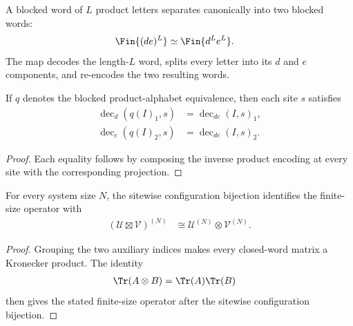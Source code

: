 \begin{definition}
    \label{def:mpu_tensor_product_block_equiv}
    \leanok
    A blocked word of $L$ product letters separates canonically into two
    blocked words:
    \begin{align}
        \Fin{(de)^L} & \simeq\Fin{d^L e^L}.
    \end{align}
    The map decodes the length-$L$ word, splits every letter into its $d$ and
    $e$ components, and re-encodes the two resulting words.
\end{definition}

\begin{lemma}
    \label{thm:mpu_tensor_product_block_decoding}
    \leanok
    If $q$ denotes the blocked product-alphabet equivalence, then each site
    $s$ satisfies
    \begin{align}
        \operatorname{dec}_d(q(I)_{1},s)
         & =\operatorname{dec}_{de}(I,s)_{1}, \\
        \operatorname{dec}_e(q(I)_{2},s)
         & =\operatorname{dec}_{de}(I,s)_{2}.
    \end{align}
\end{lemma}

\begin{proof}\leanok
    Each equality follows by composing the inverse product encoding at every
    site with the corresponding projection.
\end{proof}

\begin{lemma}
    \label{thm:mpu_finite_tensor_product}
    \leanok
    For every system size $N$, the sitewise configuration bijection identifies
    the finite-size operator with
    \begin{align}
        (\mathcal U\boxtimes\mathcal V)^{(N)}
         & \cong \mathcal U^{(N)}\otimes\mathcal V^{(N)}.
    \end{align}
\end{lemma}

\begin{proof}\leanok
    Grouping the two auxiliary indices makes every closed-word matrix a
    Kronecker product. The identity
    \begin{align}
        \Tr(A\otimes B) & =\Tr(A)\Tr(B)
    \end{align}
    then gives the stated finite-size operator after the sitewise
    configuration bijection.
\end{proof}

